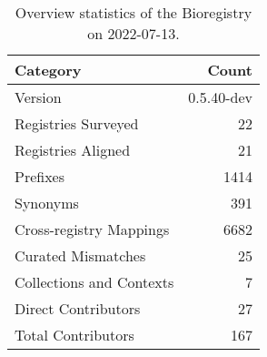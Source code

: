 \begin{table}
\centering
\caption{Overview statistics of the Bioregistry on 2022-07-13.}
\label{tab:bioregistry-summary}
\begin{tabular}{lr}
\toprule
                Category &      Count \\
\midrule
                 Version & 0.5.40-dev \\
     Registries Surveyed &         22 \\
      Registries Aligned &         21 \\
                Prefixes &       1414 \\
                Synonyms &        391 \\
 Cross-registry Mappings &       6682 \\
      Curated Mismatches &         25 \\
Collections and Contexts &          7 \\
     Direct Contributors &         27 \\
      Total Contributors &        167 \\
\bottomrule
\end{tabular}
\end{table}
